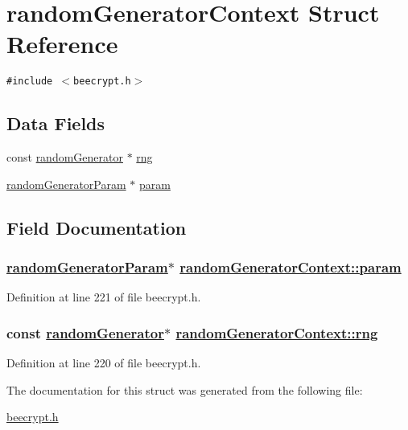 \hypertarget{structrandomGeneratorContext}{
\section{random\-Generator\-Context Struct Reference}
\label{structrandomGeneratorContext}
}
{\tt \#include $<$beecrypt.h$>$}

\subsection*{Data Fields}
\begin{CompactItemize}
\item 
const \hyperlink{structrandomGenerator}{random\-Generator} $\ast$ \hyperlink{structrandomGeneratorContext_o0}{rng}
\item 
\hyperlink{beecrypt_8h_a1}{random\-Generator\-Param} $\ast$ \hyperlink{structrandomGeneratorContext_o1}{param}
\end{CompactItemize}


\subsection{Field Documentation}
\hypertarget{structrandomGeneratorContext_o1}{
\subsubsection[param]{\setlength{\rightskip}{0pt plus 5cm}\hyperlink{beecrypt_8h_a1}{random\-Generator\-Param}$\ast$ \hyperlink{structrandomGeneratorContext_o1}{random\-Generator\-Context::param}}}
\label{structrandomGeneratorContext_o1}


Definition at line 221 of file beecrypt.h.\hypertarget{structrandomGeneratorContext_o0}{
\subsubsection[rng]{\setlength{\rightskip}{0pt plus 5cm}const \hyperlink{structrandomGenerator}{random\-Generator}$\ast$ \hyperlink{structrandomGeneratorContext_o0}{random\-Generator\-Context::rng}}}
\label{structrandomGeneratorContext_o0}


Definition at line 220 of file beecrypt.h.

The documentation for this struct was generated from the following file:\begin{CompactItemize}
\item 
\hyperlink{beecrypt_8h}{beecrypt.h}\end{CompactItemize}
